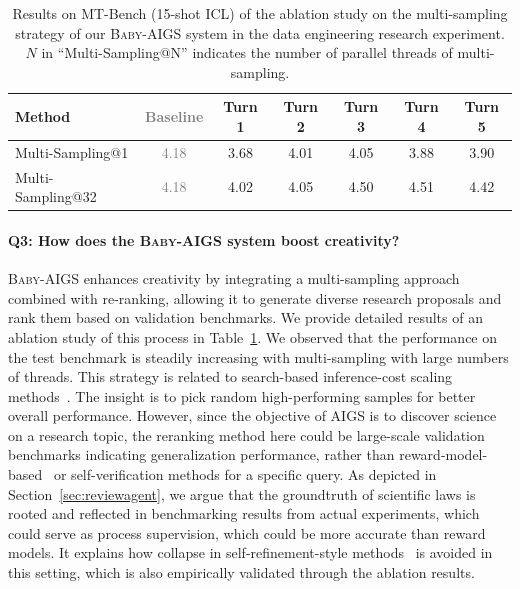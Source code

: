 \documentclass{article} %
\newcommand{\AIGS}{AIGS\xspace}
\newcommand{\AIGSSys}{\textsc{Baby-AIGS}\xspace}
\begin{document}
\begin{table}[t]
\centering
\small
\begin{tabular}{lcccccc}
\toprule
  \textbf{Method}     &   \textcolor{gray}{\textbf{Baseline}}     & \textbf{Turn 1}  & \textbf{Turn 2}  & \textbf{Turn 3} & \textbf{Turn 4} & \textbf{Turn 5} \\ \midrule\midrule 
 Multi-Sampling@1  & \textcolor{gray}{4.18}  &    3.68   &   4.01   &     4.05    &   3.88  &  3.90   \\ \midrule
 Multi-Sampling@32 &    \textcolor{gray}{4.18}  &  4.02	  &   4.05  &   4.50   &  4.51   & 4.42  \\ \bottomrule
\end{tabular}
\caption{Results on MT-Bench (15-shot ICL) of the ablation study on the multi-sampling strategy of our \AIGSSys system in the data engineering research experiment. $N$ in ``Multi-Sampling@N'' indicates the number of parallel threads of multi-sampling.}
\label{tab:abl-multi-sample}
\vspace{-1em}
\end{table}


\paragraph{\textbf{Q3: How does the \AIGSSys system boost creativity?}}

\AIGSSys enhances creativity by integrating a multi-sampling approach combined with re-ranking, allowing it to generate diverse research proposals and rank them based on validation benchmarks. We provide detailed results of an ablation study of this process in Table~\ref{tab:abl-multi-sample}. We observed that the performance on the test benchmark is steadily increasing with multi-sampling with large numbers of threads. 
This strategy is related to search-based inference-cost scaling methods~\citep{snell2024scalingllmtesttimecompute,brown2024largelanguagemonkeysscaling}. The insight is to pick random high-performing samples for better overall performance. 
However, since the objective of \AIGS is to discover science on a research topic, the reranking method here could be large-scale validation benchmarks indicating generalization performance, rather than reward-model-based~\citep{10.5555/3495724.3495977} or self-verification methods for a specific query. As depicted in Section~\ref{sec:reviewagent}, we argue that the groundtruth of scientific laws is rooted and reflected in benchmarking results from actual experiments, which could serve as process supervision, which could be more accurate than reward models. It explains how collapse in self-refinement-style methods~\citep{xu-etal-2024-pride} is avoided in this setting, which is also empirically validated through the ablation results. 
\end{document}
